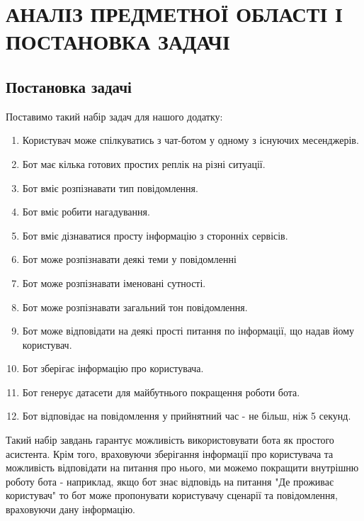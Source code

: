 \chapter{АНАЛІЗ ПРЕДМЕТНОЇ ОБЛАСТІ І ПОСТАНОВКА ЗАДАЧІ}

\section{Постановка задачі}
Поставимо такий набір задач для нашого додатку:
\begin{enumerate}
\item Користувач може спілкуватись з чат-ботом у одному з існуючих месенджерів.
\item Бот має кілька готових простих реплік на різні ситуації.
\item Бот вміє розпізнавати тип повідомлення.
\item Бот вміє робити нагадування.
\item Бот вміє дізнаватися просту інформацію з сторонніх сервісів.
\item Бот може розпізнавати деякі теми у повідомленні
\item Бот може розпізнавати іменовані сутності.
\item Бот може розпізнавати загальний тон повідомлення.
\item Бот може відповідати на деякі прості питання по інформації, що надав йому користувач.
\item Бот зберігає інформацію про користувача.
\item Бот генерує датасети для майбутнього покращення роботи бота.
\item Бот відповідає на повідомлення у прийнятний час - не більш, ніж 5 секунд.
\end{enumerate}


Такий набір завдань гарантує можливість використовувати бота як простого асистента. Крім того, враховуючи зберігання інформації про користувача та можливість відповідати на питання про нього, ми можемо покращити внутрішню роботу бота - наприклад, якщо бот знає відповідь на питання "Де проживає користувач"  то бот може пропонувати користувачу сценарії та повідомлення, враховуючи дану інформацію.
\newpage


